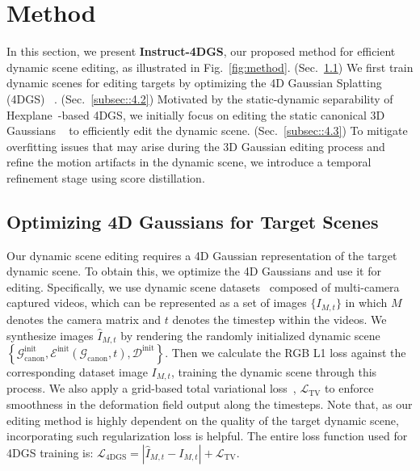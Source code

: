 \vspace{2mm}
\section{Method}
\label{sec::method}
In this section, we present \textbf{Instruct-4DGS}, our proposed method for efficient dynamic scene editing, as illustrated in Fig.~\ref{fig:method}. (Sec.~\ref{subsec::4.1}) We first train dynamic scenes for editing targets by optimizing the 4D Gaussian Splatting (4DGS) ~\cite{ref_10_4dgs}. (Sec.~\ref{subsec::4.2}) Motivated by the static-dynamic separability of Hexplane~\cite{ref_15_kplanes, ref_16_hexplane}-based 4DGS, we initially focus on editing the static canonical 3D Gaussians ~\cite{ref_8_gs} to efficiently edit the dynamic scene. (Sec.~\ref{subsec::4.3}) To mitigate overfitting issues that may arise during the 3D Gaussian editing process and refine the motion artifacts in the dynamic scene, we introduce a temporal refinement stage using score distillation.


\subsection{Optimizing 4D Gaussians for Target Scenes}
\label{subsec::4.1}
Our dynamic scene editing requires a 4D Gaussian representation of the target dynamic scene. To obtain this, we optimize the 4D Gaussians and use it for editing. Specifically, we use dynamic scene datasets~\cite{ref_37_neural3dvideo,ref_71_technicolor} composed of multi-camera captured videos, which can be represented as a set of images $\{I_{M,t}\}$ in which $M$ denotes the camera matrix and $t$ denotes the timestep within the videos. We synthesize images $\hat{I}_{M,t}$ by rendering the randomly initialized dynamic scene $\left\{\mathcal{G}_{\text{canon}}^\text{init},\mathcal{E}^\text{init}(\mathcal{G}_{\text{canon}}, t), \mathcal{D}^\text{init}\right\}$. Then we calculate the RGB L1 loss against the corresponding dataset image $I_{M,t}$, training the dynamic scene through this process. We also apply a grid-based total variational loss~\cite{ref_15_kplanes,ref_16_hexplane,ref_41_directvoxel,ref_42_fastdynamic}, $\mathcal{L}_\text{TV}$ to enforce smoothness in the deformation field output along the timesteps. Note that, as our editing method is highly dependent on the quality of the target dynamic scene, incorporating such regularization loss is helpful. The entire loss function used for 4DGS training is: $\mathcal{L}_\text{4DGS} = |\hat{I}_{M,t} - I_{M,t}| + \mathcal{L}_\text{TV}$.

